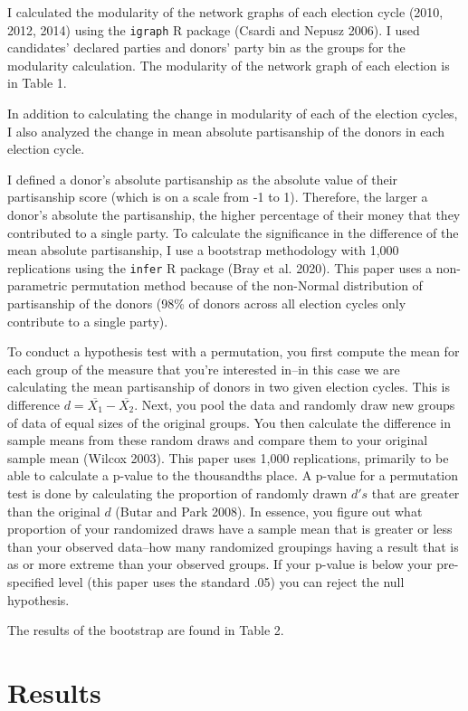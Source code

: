 \documentclass[12pt,]{article}
\begin{document}
I calculated the modularity of the network graphs of each election cycle
(2010, 2012, 2014) using the \texttt{igraph} R package (Csardi and
Nepusz 2006). I used candidates' declared parties and donors' party bin
as the groups for the modularity calculation. The modularity of the
network graph of each election is in Table 1.

In addition to calculating the change in modularity of each of the
election cycles, I also analyzed the change in mean absolute
partisanship of the donors in each election cycle.

I defined a donor's absolute partisanship as the absolute value of their
partisanship score (which is on a scale from -1 to 1). Therefore, the
larger a donor's absolute the partisanship, the higher percentage of
their money that they contributed to a single party. To calculate the
significance in the difference of the mean absolute partisanship, I use
a bootstrap methodology with 1,000 replications using the \texttt{infer}
R package (Bray et al. 2020). This paper uses a non-parametric
permutation method because of the non-Normal distribution of
partisanship of the donors (98\% of donors across all election cycles
only contribute to a single party).

To conduct a hypothesis test with a permutation, you first compute the
mean for each group of the measure that you're interested in--in this
case we are calculating the mean partisanship of donors in two given
election cycles. This is difference
\(d = \overline{X_{1}}-\overline{X_{2}}\). Next, you pool the data and
randomly draw new groups of data of equal sizes of the original groups.
You then calculate the difference in sample means from these random
draws and compare them to your original sample mean (Wilcox 2003). This
paper uses 1,000 replications, primarily to be able to calculate a
p-value to the thousandths place. A p-value for a permutation test is
done by calculating the proportion of randomly drawn \(d's\) that are
greater than the original \(d\) (Butar and Park 2008). In essence, you
figure out what proportion of your randomized draws have a sample mean
that is greater or less than your observed data--how many randomized
groupings having a result that is as or more extreme than your observed
groups. If your p-value is below your pre-specified level (this paper
uses the standard .05) you can reject the null hypothesis.

The results of the bootstrap are found in Table 2.

\hypertarget{results}{%
\section{Results}\label{results}}
\end{document}
